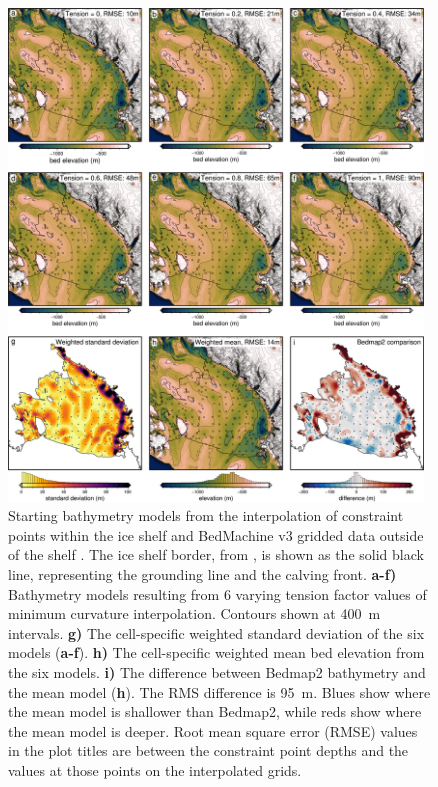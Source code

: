 \begin{figure}[!ht]
    \centering
    \includegraphics[width=0.98\textwidth]{figures/chp4/starting_bed_comparison.png}
    \caption[Ross Ice Shelf starting bathymetry]{Starting bathymetry models from the interpolation of constraint points within the ice shelf and BedMachine v3 gridded data outside of the shelf \citep{morlighemdeep2020, morlighemmeasures2022}. The ice shelf border, from \citet{mouginotmeasures2017}, is shown as the solid black line, representing the grounding line and the calving front. \textbf{a-f)} Bathymetry models resulting from 6 varying tension factor values of minimum curvature interpolation. Contours shown at 400~m intervals. \textbf{g)} The cell-specific weighted standard deviation of the six models (\textbf{a-f}). \textbf{h)} The cell-specific weighted mean bed elevation from the six models. \textbf{i)} The difference between Bedmap2 bathymetry and the mean model (\textbf{h}). The RMS difference is 95~m. Blues show where the mean model is shallower than Bedmap2, while reds show where the mean model is deeper. Root mean square error (RMSE) values in the plot titles are between the constraint point depths and the values at those points on the interpolated grids.}
    \label{fig:chp4_starting_bed_comparison}
\end{figure}

